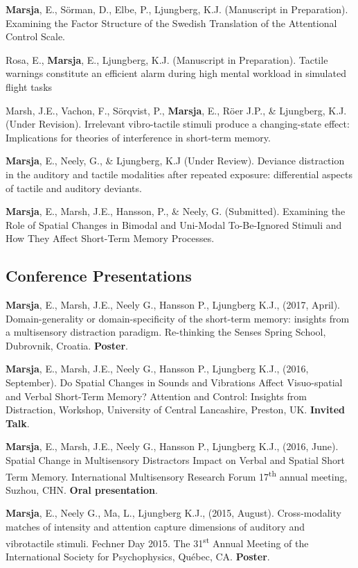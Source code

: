 \documentclass[]{article}
\begin{document}
\textbf{Marsja}, E., Sörman, D., Elbe, P., Ljungberg, K.J. (Manuscript
in Preparation). Examining the Factor Structure of the Swedish
Translation of the Attentional Control Scale.

Rosa, E., \textbf{Marsja}, E., Ljungberg, K.J. (Manuscript in
Preparation). Tactile warnings constitute an efficient alarm during high
mental workload in simulated flight tasks

Marsh, J.E., Vachon, F., Sörqvist, P., \textbf{Marsja}, E., Röer J.P.,
\& Ljungberg, K.J. (Under Revision). Irrelevant vibro-tactile stimuli
produce a changing-state effect: Implications for theories of
interference in short-term memory.

\textbf{Marsja}, E., Neely, G., \& Ljungberg, K.J (Under Review).
Deviance distraction in the auditory and tactile modalities after
repeated exposure: differential aspects of tactile and auditory
deviants.

\textbf{Marsja}, E., Marsh, J.E., Hansson, P., \& Neely, G. (Submitted).
Examining the Role of Spatial Changes in Bimodal and Uni-Modal
To-Be-Ignored Stimuli and How They Affect Short-Term Memory Processes.

\subsection{Conference Presentations}\label{conference-presentations}

\textbf{Marsja}, E., Marsh, J.E., Neely G., Hansson P., Ljungberg K.J.,
(2017, April). Domain-generality or domain-specificity of the short-term
memory: insights from a multisensory distraction paradigm. Re-thinking
the Senses Spring School, Dubrovnik, Croatia. \textbf{Poster}.

\textbf{Marsja}, E., Marsh, J.E., Neely G., Hansson P., Ljungberg K.J.,
(2016, September). Do Spatial Changes in Sounds and Vibrations Affect
Visuo-spatial and Verbal Short-Term Memory? Attention and Control:
Insights from Distraction, Workshop, University of Central Lancashire,
Preston, UK. \textbf{Invited Talk}.

\textbf{Marsja}, E., Marsh, J.E., Neely G., Hansson P., Ljungberg K.J.,
(2016, June). Spatial Change in Multisensory Distractors Impact on
Verbal and Spatial Short Term Memory. International Multisensory
Research Forum 17\textsuperscript{th} annual meeting, Suzhou, CHN.
\textbf{Oral presentation}.

\textbf{Marsja}, E., Neely G., Ma, L., Ljungberg K.J., (2015, August).
Cross-modality matches of intensity and attention capture dimensions of
auditory and vibrotactile stimuli. Fechner Day 2015. The
31\textsuperscript{st} Annual Meeting of the International Society for
Psychophysics, Québec, CA. \textbf{Poster}.
\end{document}
